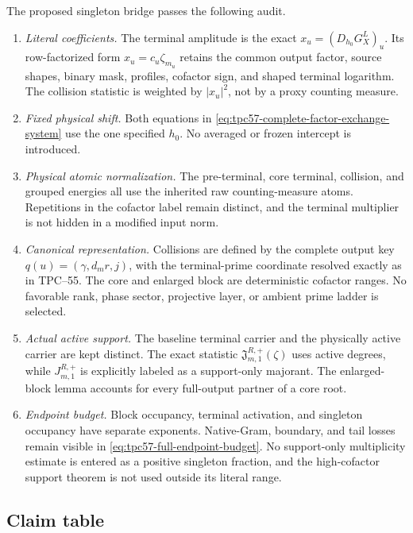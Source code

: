 The proposed singleton bridge passes the following audit.
\begin{enumerate}[label=\textup{(A\arabic*)},leftmargin=3.2em]
 \item \emph{Literal coefficients.}
       The terminal amplitude is the exact
       \(x_u=(D_{h_0}G_X^L)_u\).  Its row-factorized form
       \(x_u=c_u\zeta_{m_u}\) retains the common output factor, source
       shapes, binary mask, profiles, cofactor sign, and shaped terminal
       logarithm.  The collision statistic is weighted by \(|x_u|^2\),
       not by a proxy counting measure.
 \item \emph{Fixed physical shift.}
       Both equations in
       \eqref{eq:tpc57-complete-factor-exchange-system} use the one specified
       \(h_0\).  No averaged or frozen intercept is introduced.
 \item \emph{Physical atomic normalization.}
       The pre-terminal, core terminal, collision, and grouped energies all
       use the inherited raw counting-measure atoms.  Repetitions in the
       cofactor label remain distinct, and the terminal multiplier is not
       hidden in a modified input norm.
 \item \emph{Canonical representation.}
       Collisions are defined by the complete output key
       \(q(u)=(\gamma,d_mr,j)\), with the terminal-prime coordinate resolved
       exactly as in TPC--55.  The core and enlarged block are deterministic
       cofactor ranges.  No favorable rank, phase sector, projective layer,
       or ambient prime ladder is selected.
 \item \emph{Actual active support.}
       The baseline terminal carrier and the physically active carrier are
       kept distinct.  The exact statistic
       \(\mathfrak J_{m,1}^{R,+}(\zeta)\) uses active degrees, while
       \(J_{m,1}^{R,+}\) is explicitly labeled as a support-only majorant.
       The enlarged-block lemma accounts for every full-output partner of a
       core root.
 \item \emph{Endpoint budget.}
       Block occupancy, terminal activation, and singleton occupancy have
       separate exponents.  Native-Gram, boundary, and tail losses remain
       visible in \eqref{eq:tpc57-full-endpoint-budget}.  No support-only
       multiplicity estimate is entered as a positive singleton fraction,
       and the high-cofactor support theorem is not used outside its literal
       range.
\end{enumerate}

\subsection{Claim table}

